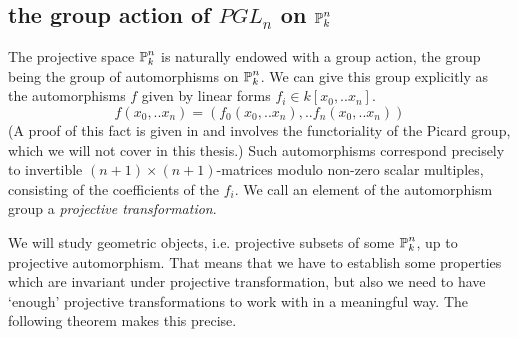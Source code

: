 \subsection{the group action of $PGL_n$ on $\operatorname{\mathbb P}^n_k$}

The projective space $\operatorname{\mathbb P}^n_k$ is naturally endowed with a group action, the group being the group of automorphisms on $\operatorname{\mathbb P}^n_k$.
We can give this group explicitly as the automorphisms $f$ given by linear forms $f_i \in k[x_0,..x_n]$.
\begin{equation}
f(x_0,..x_n) = (f_0(x_0,..x_n),..f_n(x_0,..x_n))
\end{equation}
(A proof of this fact is given in \cite[example 7.1.1]{hartshorne1977algebraic} and involves the functoriality of the Picard group, which we will not cover in this thesis.)
Such automorphisms correspond precisely to invertible $(n+1)\times(n+1)$-matrices modulo non-zero scalar multiples, consisting of the coefficients of the $f_i$.
We call an element of the automorphism group a \emph{projective transformation}.

We will study geometric objects, i.e. projective subsets of some $\operatorname{\mathbb P}^n_k$, up to projective automorphism.
That means that we have to establish some properties which are invariant under projective transformation, but also we need to have `enough' projective transformations to work with in a meaningful way.
The following theorem makes this precise.

